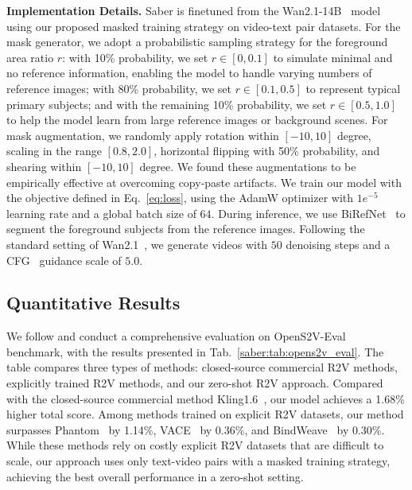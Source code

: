 \noindent \textbf{Implementation Details.}
Saber is finetuned from the Wan2.1-14B~\citep{wan2025wan} model using our proposed masked training strategy on video-text pair datasets.
%
For the mask generator, we adopt a probabilistic sampling strategy for the foreground area ratio $r$: with 10\% probability, we set $r \in [0, 0.1]$ to simulate minimal and no reference information, enabling the model to handle varying numbers of reference images; with 80\% probability, we set $r \in [0.1,0.5]$ to represent typical primary subjects; and with the remaining 10\% probability, we set $r \in [0.5,1.0]$ to help the model learn from large reference images or background scenes.
%
For mask augmentation, we randomly apply rotation within $[-10, 10]$ degree, scaling in the range $[0.8, 2.0]$, horizontal flipping with 50\% probability, and shearing within $[-10, 10]$ degree.
We found these augmentations to be empirically effective at overcoming copy-paste artifacts.
%
We train our model with the objective defined in Eq.~\ref{eq:loss}, using the AdamW optimizer with $1e^{-5}$ learning rate and a global batch size of $64$.
During inference, we use BiRefNet~\citep{zheng2024bilateral} to segment the foreground subjects from the reference images.
Following the standard setting of Wan2.1~\citep{wan2025wan}, we generate videos with $50$ denoising steps and a CFG~\citep{ho2022classifier} guidance scale of $5.0$.


\subsection{Quantitative Results}

We follow \citet{yuan2025opens2v} and conduct a comprehensive evaluation on OpenS2V-Eval~\citep{yuan2025opens2v} benchmark, with the results presented in Tab.~\ref{saber:tab:opens2v_eval}.
The table compares three types of methods: closed-source commercial R2V methods, explicitly trained R2V methods, and our zero-shot R2V approach.
Compared with the closed-source commercial method Kling1.6~\citep{kling}, our model achieves a 1.68\% higher total score.
Among methods trained on explicit R2V datasets, our method surpasses Phantom~\citep{liu2025phantom} by 1.14\%, VACE~\citep{jiang2025vace} by 0.36\%, and BindWeave~\citep{li2025bindweave} by 0.30\%.
While these methods rely on costly explicit R2V datasets that are difficult to scale, our approach uses only text-video pairs with a masked training strategy, achieving the best overall performance in a zero-shot setting.

